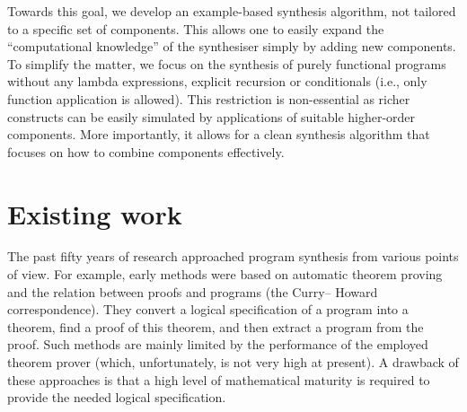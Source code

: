 Towards this goal, we develop an example-based synthesis algorithm, not tailored to a specific set of components.  This allows one to easily expand the ``computational knowledge'' of the synthesiser simply by adding new components.  To simplify the matter, we focus on the synthesis of purely functional programs without any lambda expressions, explicit recursion or conditionals (i.e., only function application is allowed).  This restriction is non-essential as richer constructs can be easily simulated by applications of suitable higher-order components.  More importantly, it allows for a clean synthesis algorithm that focuses on how to combine components effectively.


\section{Existing work}\label{Background}
The past fifty years of research approached program synthesis from various points of view.  For example, early methods \cite{Manna:1980:DAP:357084.357090} were based on automatic theorem proving and the relation between proofs and programs (the Curry– Howard correspondence).  They convert a logical specification of a program into a theorem, find a proof of this theorem, and then extract a program from the proof.  Such methods are mainly limited by the performance of the employed theorem prover (which, unfortunately, is not very high at present).  A drawback of these approaches is that a high level of mathematical maturity is required to provide the needed logical specification.

